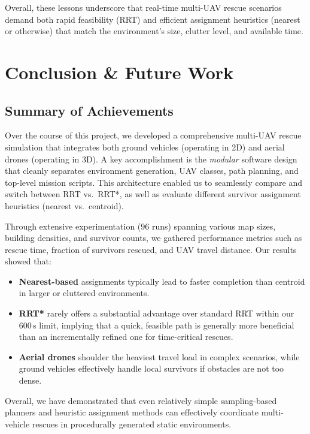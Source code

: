 \documentclass[12pt,a4paper]{report}
\begin{document}
Overall, these lessons underscore that real-time multi-UAV rescue scenarios demand
both rapid feasibility (RRT) and efficient assignment heuristics (nearest or otherwise)
that match the environment's size, clutter level, and available time.

\chapter{Conclusion \& Future Work}
\label{ch:conclusion}

\section{Summary of Achievements}
Over the course of this project, we developed a comprehensive multi-UAV rescue simulation
that integrates both ground vehicles (operating in 2D) and aerial drones (operating in 3D).
A key accomplishment is the \emph{modular} software design that cleanly separates
environment generation, UAV classes, path planning, and top-level mission scripts.
This architecture enabled us to seamlessly compare and switch between RRT vs.\ RRT*,
as well as evaluate different survivor assignment heuristics (nearest vs.\ centroid).

Through extensive experimentation (96 runs) spanning various map sizes, building densities,
and survivor counts, we gathered performance metrics such as rescue time, fraction of
survivors rescued, and UAV travel distance. Our results showed that:
\begin{itemize}
    \item \textbf{Nearest-based} assignments typically lead to faster completion than
          centroid in larger or cluttered environments.
    \item \textbf{RRT*} rarely offers a substantial advantage over standard RRT within
          our 600\,s limit, implying that a quick, feasible path is generally more
          beneficial than an incrementally refined one for time-critical rescues.
    \item \textbf{Aerial drones} shoulder the heaviest travel load in complex scenarios,
          while ground vehicles effectively handle local survivors if obstacles are not
          too dense.
\end{itemize}
Overall, we have demonstrated that even relatively simple sampling-based planners and
heuristic assignment methods can effectively coordinate multi-vehicle rescues in
procedurally generated static environments.
\end{document}
